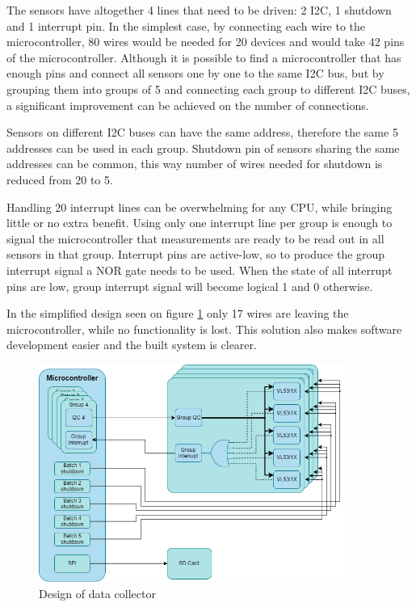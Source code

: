 The sensors have altogether 4 lines that need to be driven: 2 I2C, 1 shutdown and 1 interrupt pin.
In the simplest case, by connecting each wire to the microcontroller, 80 wires would be needed for 
20 devices and would take 42 pins of the microcontroller. Although it is possible to find a microcontroller 
that has enough pins and connect all sensors one by one to the same I2C bus, but by grouping them 
into groups of 5 and connecting each group to different I2C buses, a significant improvement can be 
achieved on the number of connections. 

Sensors on different I2C buses can have the same address, therefore the same 5 addresses can be used
in each group. Shutdown pin of sensors sharing the same addresses can be common, this way number of
wires needed for shutdown is reduced from 20 to 5.

Handling 20 interrupt lines can be overwhelming for any CPU, while bringing little or no extra
benefit. Using only one interrupt line per group is enough to signal the microcontroller that 
measurements are ready to be read out in all sensors in that group. Interrupt pins are active-low,
so to produce the group interrupt signal a NOR gate needs to be used. When the state of all interrupt
pins are low, group interrupt signal will become logical 1 and 0 otherwise.

In the simplified design seen on figure \ref{fig:data_collector} only 17 wires are leaving
the microcontroller, while no functionality is lost. This solution also makes software development
easier and the built system is clearer.


\begin{figure}[ht]
    \centering
    \includegraphics[width=100mm, keepaspectratio]{figures/data_collector.png}
    \caption{Design of data collector}
    \label{fig:data_collector}
\end{figure}

